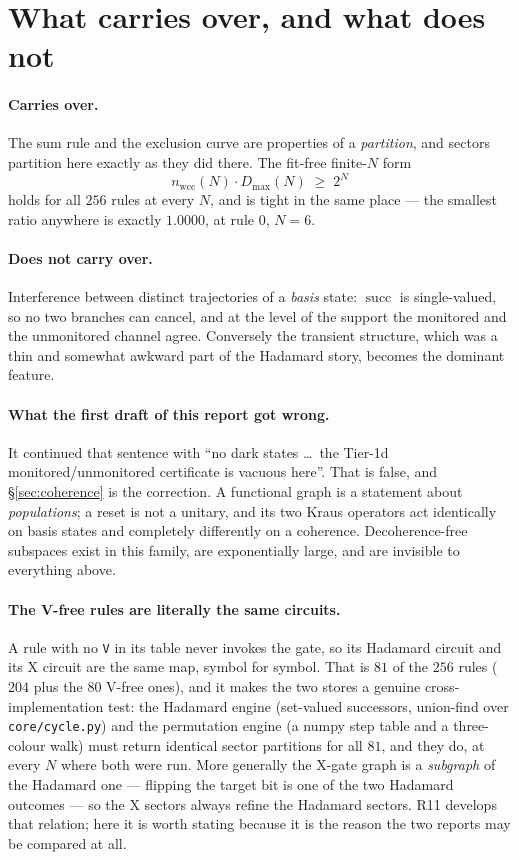\documentclass[11pt]{article}
\newcommand{\rt}[1]{\texttt{#1}}
\newcommand{\fn}[1]{\texttt{#1}}
\newcommand{\wcc}{\mathrm{wcc}}
\theoremstyle{plain}
\theoremstyle{definition}
\begin{document}
\section{What carries over, and what does not}
\label{sec:carry}

\paragraph{Carries over.} The sum rule and the exclusion curve are properties of a
\emph{partition}, and sectors partition here exactly as they did there. The
fit-free finite-$N$ form
\[
n_\wcc(N)\cdot D_{\max}(N)\;\ge\;2^N
\]
holds for all $256$ rules at every $N$, and is tight in the same place --- the
smallest ratio anywhere is exactly $1.0000$, at rule $0$, $N=6$.

\paragraph{Does not carry over.} Interference between distinct trajectories of a
\emph{basis} state: $\operatorname{succ}$ is single-valued, so no two branches can
cancel, and at the level of the support the monitored and the unmonitored channel
agree. Conversely the transient structure, which was a thin and somewhat awkward
part of the Hadamard story, becomes the dominant feature.

\paragraph{What the first draft of this report got wrong.} It continued that
sentence with ``no dark states \ldots\ the Tier-1d monitored/unmonitored
certificate is vacuous here''. That is false, and \S\ref{sec:coherence} is the
correction. A functional graph is a statement about \emph{populations}; a reset
is not a unitary, and its two Kraus operators act identically on basis states and
completely differently on a coherence. Decoherence-free subspaces exist in this
family, are exponentially large, and are invisible to everything above.

\paragraph{The V-free rules are literally the same circuits.}
\label{sec:refine-note}
A rule with no \rt{V} in its table never invokes the gate, so its Hadamard
circuit and its X circuit are the same map, symbol for symbol. That is $81$ of
the $256$ rules ($204$ plus the $80$ V-free ones), and it makes the two stores a
genuine cross-implementation test: the Hadamard engine (set-valued successors,
union-find over \fn{core/cycle.py}) and the permutation engine (a numpy step
table and a three-colour walk) must return identical sector partitions for all
$81$, and they do, at every $N$ where both were run. More generally the X-gate
graph is a \emph{subgraph} of the Hadamard one --- flipping the target bit is one
of the two Hadamard outcomes --- so the X sectors always refine the Hadamard
sectors. R11 develops that relation; here it is worth stating because it is the
reason the two reports may be compared at all.
\end{document}

